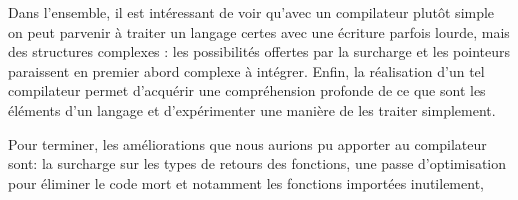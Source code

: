 \documentclass[11pt,a4paper]{article}
\begin{document}
Dans l'ensemble, il est intéressant de voir qu'avec un compilateur plutôt simple on peut parvenir à traiter un langage certes avec une écriture parfois lourde, mais des structures complexes : les possibilités offertes par la surcharge et les pointeurs paraissent en premier abord complexe à intégrer. Enfin, la réalisation d'un tel compilateur permet d'acquérir une compréhension profonde de ce que sont les éléments d'un langage et d'expérimenter une manière de les traiter simplement.

Pour terminer, les améliorations que nous aurions pu apporter au compilateur sont: la surcharge sur les types de retours des fonctions, une passe d'optimisation pour éliminer le code mort et notamment les fonctions importées inutilement, 
\end{document}
